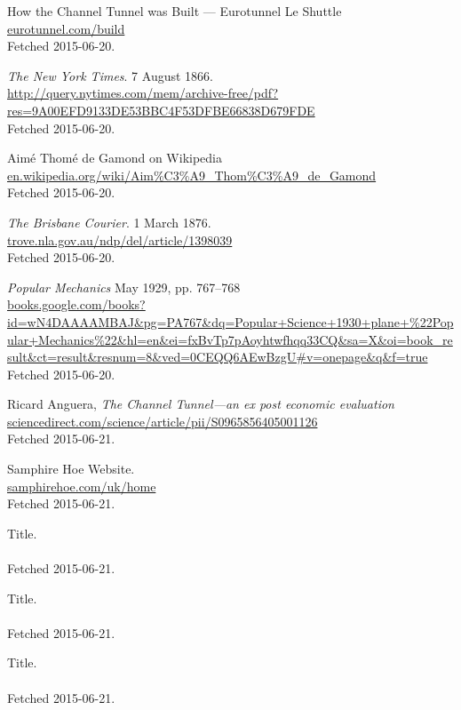 \documentclass[12pt]{article} %
\begin{document}
\begin{thebibliography}{99}

	How the Channel Tunnel was Built --- Eurotunnel Le Shuttle\\
	\url{eurotunnel.com/build}\\
	Fetched 2015-06-20.

	\textit{The New York Times}. 7 August 1866.\\
	\url{http://query.nytimes.com/mem/archive-free/pdf?res=9A00EFD9133DE53BBC4F53DFBE66838D679FDE}\\
	Fetched 2015-06-20.

	Aimé Thomé de Gamond on Wikipedia\\
	\url{en.wikipedia.org/wiki/Aim%C3%A9_Thom%C3%A9_de_Gamond}\\
	Fetched 2015-06-20.

	\textit{The Brisbane Courier}. 1 March 1876.\\
	\url{trove.nla.gov.au/ndp/del/article/1398039}\\
	Fetched 2015-06-20.

	\emph{Popular Mechanics} May 1929, pp. 767--768\\
	\url{books.google.com/books?id=wN4DAAAAMBAJ&pg=PA767&dq=Popular+Science+1930+plane+%22Popular+Mechanics%22&hl=en&ei=fxBvTp7pAoyhtwfhqq33CQ&sa=X&oi=book_result&ct=result&resnum=8&ved=0CEQQ6AEwBzgU#v=onepage&q&f=true}\\
	Fetched 2015-06-20.

	Ricard Anguera, \textit{The Channel Tunnel---an ex post economic evaluation}\\
	\url{sciencedirect.com/science/article/pii/S0965856405001126}\\
	Fetched 2015-06-21.

	Samphire Hoe Website.\\
	\url{samphirehoe.com/uk/home}\\
	Fetched 2015-06-21.

\bibitem{}
	Title.\\
	\url{}\\
	Fetched 2015-06-21.

\bibitem{}
	Title.\\
	\url{}\\
	Fetched 2015-06-21.

\bibitem{}
	Title.\\
	\url{}\\
	Fetched 2015-06-21.

\end{thebibliography}
\end{document}
